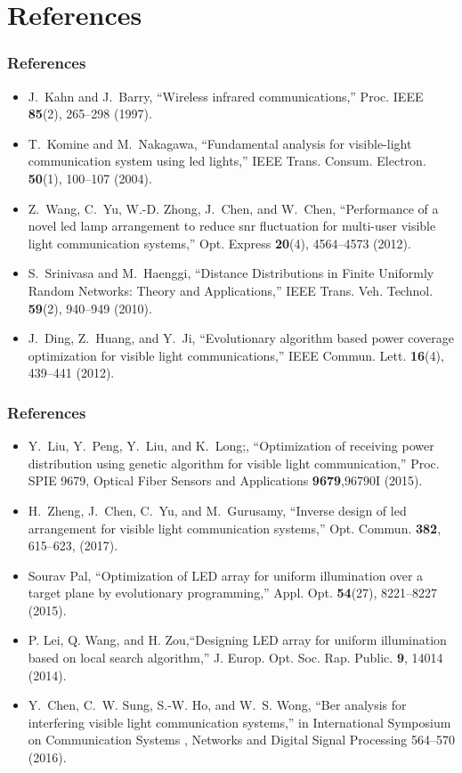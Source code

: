 \documentclass[slidestop,usepdftitle=false]{gvvslides}
\begin{document}
\section{References}
\begin{frame}
\frametitle{References}
\begin{itemize}
 \vfill
\item
J.~Kahn and J.~Barry, ``Wireless infrared communications,'' Proc. IEEE  \textbf{85}(2), 265--298 (1997).
 \vfill
\item
T.~Komine and M.~Nakagawa, ``Fundamental analysis for visible-light
  communication system using led lights,'' IEEE Trans. Consum. Electron.  \textbf{50}(1), 100--107 (2004).
  \vfill
\item
Z.~Wang, C.~Yu, W.-D. Zhong, J.~Chen, and W.~Chen, ``Performance of a novel led
  lamp arrangement to reduce snr fluctuation for multi-user visible light
  communication systems,'' Opt. Express \textbf{20}(4), 4564--4573 (2012).
 \vfill
\item
S.~Srinivasa and M.~Haenggi, ``Distance {D}istributions in {F}inite {U}niformly
  {R}andom {N}etworks: {T}heory and {A}pplications,'' IEEE Trans. Veh. Technol. \textbf{59}(2), 940--949 (2010).
  \vfill
\item
J.~Ding, Z.~Huang, and Y.~Ji, ``Evolutionary algorithm based power coverage
  optimization for visible light communications,'' IEEE Commun. Lett. \textbf{16}(4), 439--441 (2012).
 \vfill
\end{itemize}
\end{frame}

\begin{frame}
\frametitle{References}
\begin{itemize}
 \vfill
\item
Y.~Liu, Y.~Peng, Y.~Liu, and K.~Long;, ``Optimization of receiving power
  distribution using genetic algorithm for visible light communication,''
  Proc. SPIE 9679, Optical Fiber Sensors and Applications \textbf{9679},96790I (2015).
 \vfill
\item
H.~Zheng, J.~Chen, C.~Yu, and M.~Gurusamy, ``Inverse design of led arrangement
  for visible light communication systems,'' Opt. Commun. \textbf{382}, 615--623, (2017).
  \vfill
\item
Sourav Pal, ``Optimization of LED array for uniform illumination over a target plane by evolutionary programming,'' Appl. Opt. \textbf{54}(27), 8221--8227 (2015). 
 \vfill
\item
  P. Lei, Q. Wang, and H. Zou,``Designing LED array for uniform illumination based on local search algorithm,'' J. Europ. Opt. Soc. Rap. Public. \textbf{9}, 14014 (2014).
   \vfill
\item
Y.~Chen, C.~W. Sung, S.-W. Ho, and W.~S. Wong, ``Ber analysis for interfering
  visible light communication systems,'' in International Symposium on
  Communication Systems , Networks and Digital Signal Processing 564--570 (2016).
 \vfill
\end{itemize}

\end{frame}
\end{document}
